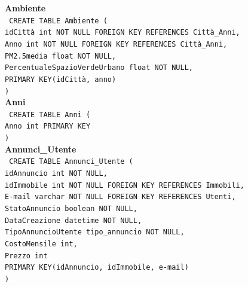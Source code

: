 \documentclass[a4paper,12pt]{report}
\begin{document}
                \noindent
                {\large \textbf{Ambiente}} \\
                \texttt{
                    CREATE TABLE Ambiente ( \\
                    \null\quad\quad idCittà int NOT NULL FOREIGN KEY REFERENCES Città\_Anni, \\
                    \null\quad\quad Anno int NOT NULL FOREIGN KEY REFERENCES Città\_Anni, \\
                    \null\quad\quad PM2.5media                      float           NOT NULL, \\
                    \null\quad\quad PercentualeSpazioVerdeUrbano    float           NOT NULL, \\
                    \null\quad\quad PRIMARY KEY(idCittà, anno) \\
                    )
                } \\

                \noindent
                {\large \textbf{Anni}} \\
                \texttt{
                    CREATE TABLE Anni ( \\
                    \null\quad\quad Anno    int     PRIMARY KEY \\
                    )
                } \\

                \noindent
                {\large \textbf{Annunci\_Utente}} \\
                \texttt{
                    CREATE TABLE Annunci\_Utente ( \\
                    \null\quad\quad idAnnuncio          int             NOT NULL, \\ 
                    \null\quad\quad idImmobile int NOT NULL FOREIGN KEY REFERENCES Immobili, \\
                    \null\quad\quad E-mail varchar NOT NULL FOREIGN KEY REFERENCES Utenti, \\
                    \null\quad\quad StatoAnnuncio       boolean         NOT NULL, \\
                    \null\quad\quad DataCreazione       datetime        NOT NULL, \\
                    \null\quad\quad TipoAnnuncioUtente  tipo\_annuncio  NOT NULL, \\
                    \null\quad\quad CostoMensile        int, \\
                    \null\quad\quad Prezzo              int \\
                    \null\quad\quad PRIMARY KEY(idAnnuncio, idImmobile, e-mail) \\
                    )
                } \\
\end{document}
